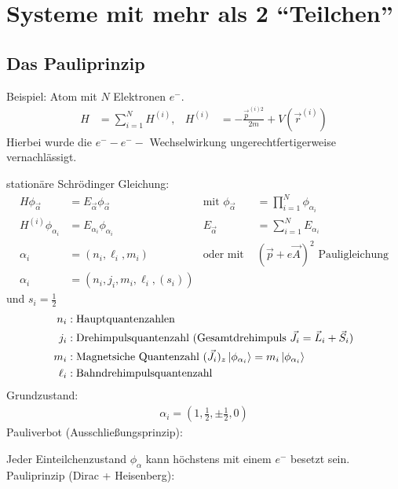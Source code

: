 \section{Systeme mit mehr als 2 ``Teilchen''}
	\subsection{Das Pauliprinzip}
		Beispiel: Atom mit $N$ Elektronen $e^-$.
			\begin{align*}
				H &= \sum_{i=1}^N H^{(i)} ,& 
				H^{(i)} &= - \frac{\vec{p}^{(i)2}}{2m} + V(\vec{r}^{(i)}) 
			\end{align*}
		Hierbei wurde die $e^- -e^- -$ Wechselwirkung ungerechtfertigerweise vernachlässigt.
		
		stationäre Schrödinger Gleichung:
			\begin{align*}
				H \phi_{\vec{\alpha}} &= E_{\vec{\alpha}} \phi_{\vec{\alpha}} 
				&\text{mit } \phi_{\vec{\alpha}} &= \prod_{i=1}^N \phi_{\alpha_i} \\
				H^{(i)} \phi_{\alpha_i} &= E_{\alpha_i} \phi_{\alpha_i} 
				&E_{\vec{\alpha}} &= \sum_{i=1}^N E_{\alpha_i} \\
				\alpha_i &= (n_i, \ell_i , m_i) 
				&\text{oder mit } &(\vec{p}+e \vec{A})^2 
				\text{ Pauligleichung} \\
				\alpha_i &= (n_i, j_i, m_i , \ell_i ,(s_i))
			\end{align*}
		und $s_i = \frac{1}{2}$
			\begin{align*}
				n_i &: \text{Hauptquantenzahlen} \\
				j_i &: \text{Drehimpulsquantenzahl } ( \text{Gesamtdrehimpuls } \vec{J}_i = \vec{L}_i + \vec{S}_i) \\
				m_i &: \text{Magnetsiche Quantenzahl } (\vec{J}_i)_z \ket{\phi_{\alpha_i}} = m_i \ket{\phi_{\alpha_i}} \\
				\ell_i &: \text{Bahndrehimpulsquantenzahl}
			\end{align*}
		Grundzustand:
			\begin{align*}
				\alpha_i = (1, \frac{1}{2}, \pm \frac{1}{2}, 0)
			\end{align*}
		Pauliverbot (Ausschließungsprinzip):
		
		Jeder Einteilchenzustand $\phi_\alpha$ kann höchstens mit einem $e^-$ besetzt sein. \\
		Pauliprinzip (Dirac + Heisenberg):
		
